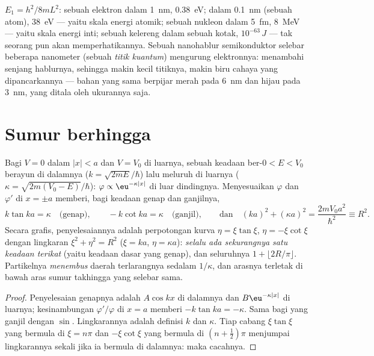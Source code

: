 \begin{example}\label{ex:b2:potential-wells-tunneling:orders}
$E_1 = h^2/8mL^2$: sebuah elektron dalam \qty{1}{nm}, \qty{0.38}{eV}; dalam
\qty{0.1}{nm} (sebuah atom), \qty{38}{eV} --- yaitu skala energi atomik; sebuah
nukleon dalam \qty{5}{fm}, \qty{8}{MeV} --- yaitu skala energi inti; sebuah
kelereng dalam sebuah kotak, $10^{-63}\,\unit{J}$ --- tak seorang pun akan memperhatikannya. Sebuah
nanohablur semikonduktor selebar beberapa nanometer (sebuah \emph{titik
kuantum}) mengurung elektronnya:  menambahi
senjang hablurnya, sehingga makin kecil titiknya, makin biru cahaya yang dipancarkannya ---
bahan yang sama berpijar merah pada \qty{6}{nm} dan hijau pada \qty{3}{nm},
yang ditala oleh ukurannya saja.
\end{example}

\section{Sumur berhingga}

\begin{proposition}\label{prop:b2:potential-wells-tunneling:finite}
Bagi $V = 0$ dalam $|x| < a$ dan $V = V_0$ di luarnya, sebuah keadaan ber-$0 < E < V_0$
berayun di dalamnya ($k = \sqrt{2mE}/\hbar$) lalu meluruh di luarnya ($\kappa =
\sqrt{2m(V_0 - E)}/\hbar$): $\varphi \propto \eu^{-\kappa|x|}$ di luar dindingnya.
Menyesuaikan $\varphi$ dan $\varphi'$ di $x = \pm a$ memberi, bagi keadaan genap dan
ganjilnya,
\[
k\tan ka = \kappa \quad\text{(genap)}, \qquad
-k\cot ka = \kappa \quad\text{(ganjil)}, \qquad\text{dan}\quad
(ka)^2 + (\kappa a)^2 = \frac{2mV_0a^2}{\hbar^2} \equiv R^2 .
\]
Secara grafis, penyelesaiannya adalah perpotongan kurva $\eta =
\xi\tan\xi$, $\eta = -\xi\cot\xi$ dengan lingkaran $\xi^2 + \eta^2 = R^2$
($\xi = ka$, $\eta = \kappa a$): \emph{selalu ada sekurangnya satu keadaan
terikat} (yaitu keadaan dasar yang genap), dan seluruhnya $1 + \lfloor 2R/\pi\rfloor$.
Partikelnya \emph{menembus} daerah terlarangnya sedalam
$1/\kappa$, dan arasnya terletak di bawah aras sumur takhingga yang
selebar sama.
\end{proposition}

\begin{proof}
Penyelesaian genapnya adalah $A\cos kx$ di dalamnya dan $B\eu^{-\kappa|x|}$ di luarnya;
kesinambungan $\varphi'/\varphi$ di $x = a$ memberi $-k\tan ka = -\kappa$. Sama
bagi yang ganjil dengan $\sin$. Lingkarannya adalah definisi $k$ dan
$\kappa$. Tiap cabang $\xi\tan\xi$ yang bermula di $\xi = n\pi$ dan
$-\xi\cot\xi$ yang bermula di $(n + \tfrac12)\pi$ menjumpai lingkarannya sekali jika ia
bermula di dalamnya: maka cacahnya.
\end{proof}

